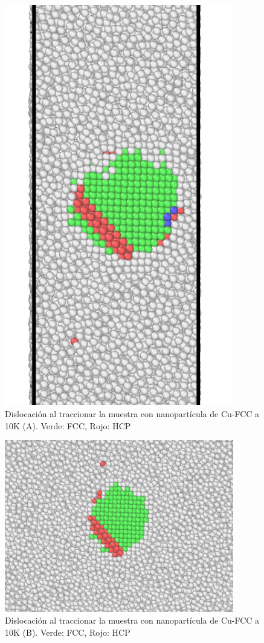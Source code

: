 \documentclass[10pt, oneside]{article} %
\begin{document}
\begin{figure}[H]
\centering
\includegraphics[width=10cm]{Figures/NanoParticles/cuSphereTension_10K_Snapshot_670_Macla_A.png}
\caption{Dislocación al traccionar la muestra con nanopartícula de Cu-FCC a 10K (A). Verde: FCC, Rojo: HCP}
\end{figure}

\begin{figure}[H]
\centering
\includegraphics[width=10cm]{Figures/NanoParticles/cuSphereTension_10K_Snapshot_670_Macla_B.png}
\caption{Dislocación al traccionar la muestra con nanopartícula de Cu-FCC a 10K (B). Verde: FCC, Rojo: HCP}
\end{figure}
\end{document}
